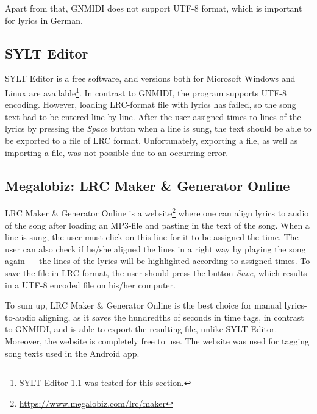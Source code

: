 Apart from that, GNMIDI does not support UTF-8 format, which is important for lyrics in German.

\subsection{SYLT Editor}

SYLT Editor is a free software, and versions both for Microsoft Windows and Linux are available\footnote{SYLT Editor 1.1 was tested for this section.}. In contrast to GNMIDI, the program supports UTF-8 encoding. However, loading LRC-format file with lyrics has failed, so the song text had to be entered line by line. After the user assigned times to lines of the lyrics by pressing the \textit{Space} button when a line is sung, the text should be able to be exported to a file of LRC format. Unfortunately, exporting a file, as well as importing a file, was not possible due to an occurring error.

\subsection{Megalobiz: LRC Maker \& Generator Online}

LRC Maker \& Generator Online is a website\footnote{\url{https://www.megalobiz.com/lrc/maker}} where one can align lyrics to audio of the song after loading an MP3-file and pasting in the text of the song. When a line is sung, the user must click on this line for it to be assigned the time. The user can also check if he/she aligned the lines in a right way by playing the song again --- the lines of the lyrics will be highlighted according to assigned times. To save the file in LRC format, the user should press the button \textit{Save}, which results in a UTF-8 encoded file on his/her computer.

To sum up, LRC Maker \& Generator Online is the best choice for manual lyrics-to-audio aligning, as it saves the hundredths of seconds in time tags, in contrast to GNMIDI, and is able to export the resulting file, unlike SYLT Editor. Moreover, the website is completely free to use. The website was used for tagging song texts used in the Android app.